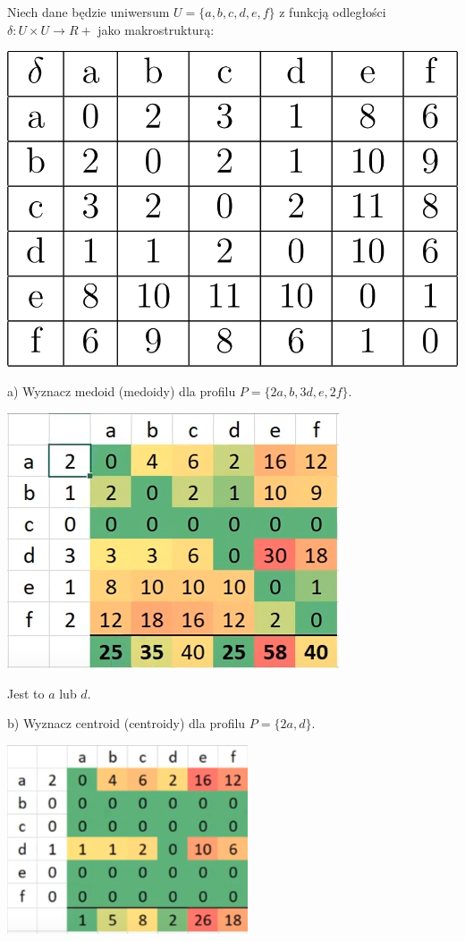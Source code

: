 \documentclass[12pt]{article}
\begin{document}
\begin{przyklad}
    Niech dane będzie uniwersum $U = \{a, b, c, d, e, f\}$ z funkcją odległości
    $\delta : U \times U \to R+$ jako makrostrukturą:

    \begin{center}
        \includegraphics[scale=0.2]{macierz.png}
    \end{center}

    a) Wyznacz medoid (medoidy) dla profilu $P = \{2a, b, 3d, e, 2f\}$.
    \begin{center}
        \includegraphics[scale=0.4]{medoid.png}

        Jest to $a$ lub $d$.
    \end{center}

    b) Wyznacz centroid (centroidy) dla profilu $P = \{2a, d\}$.
    \begin{center}
        \includegraphics*[scale=0.5]{centroid.png}
        

\end{center}
\end{przyklad}
\end{document}
